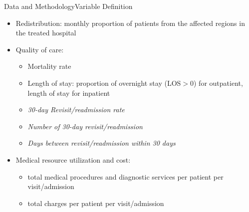 \documentclass{beamer}
\theoremstyle{definition}
\begin{document}


    



\begin{frame}{Data and Methodology}{Variable Definition}

\begin{itemize}
\setlength{\itemsep}{15pt}
    \item Redistribution: monthly proportion of patients from the affected regions in the treated hospital
    \item Quality of care: 
    \begin{itemize}
    \setlength{\itemsep}{4pt}
        \item Mortality rate
        \item Length of stay: proportion of overnight stay (LOS$>$0) for outpatient, length of stay for inpatient
        \item \textit{30-day Revisit/readmission rate} \item \textit{Number of 30-day revisit/readmission}
        \item \textit{Days between revisit/readmission within 30 days}
    \end{itemize}
    \item Medical resource utilization and cost: 
    \begin{itemize}
    \setlength{\itemsep}{4pt}
        \item total medical procedures and diagnostic services per patient per visit/admission
        \item total charges per patient per visit/admission
    \end{itemize}
\end{itemize}

\end{frame}
\end{document}

